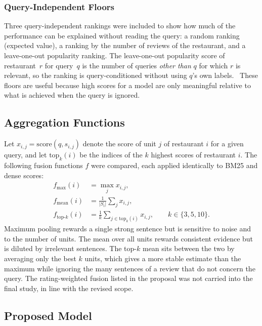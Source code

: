 \subsubsection{Query-Independent Floors}
\label{sec:floors}

Three query-independent rankings were included to show how much of the performance can be explained without reading the query: a random ranking (expected value), a ranking by the number of reviews of the restaurant, and a leave-one-out popularity ranking. The leave-one-out popularity score of restaurant~$r$ for query~$q$ is the number of queries \emph{other than} $q$ for which $r$ is relevant, so the ranking is query-conditioned without using $q$'s own labels.
\ These floors are useful because high scores for a model are only meaningful relative to what is achieved when the query is ignored.

\subsection{Aggregation Functions}
\label{sec:aggregation}

Let $x_{i,j}=\mathrm{score}(q,s_{i,j})$ denote the score of unit $j$ of restaurant $i$ for a given query, and let $\mathrm{top}_k(i)$ be the indices of the $k$ highest scores of restaurant $i$. The following fusion functions $f$ were compared, each applied identically to BM25 and dense scores:
\begin{align}
f_{\max}(i) &= \max_{j} x_{i,j}, \\
f_{\text{mean}}(i) &= \frac{1}{|S_i|}\sum_{j} x_{i,j}, \\
f_{\text{top-}k}(i) &= \frac{1}{k}\sum_{j\in \mathrm{top}_k(i)} x_{i,j}, \qquad k\in\{3,5,10\}.
\end{align}
Maximum pooling rewards a single strong sentence but is sensitive to noise and to the number of units. The mean over all units rewards consistent evidence but is diluted by irrelevant sentences. The top-$k$ mean sits between the two by averaging only the best $k$ units, which gives a more stable estimate than the maximum while ignoring the many sentences of a review that do not concern the query. The rating-weighted fusion listed in the proposal was not carried into the final study, in line with the revised scope.

\subsection{Proposed Model}
\label{sec:proposed}

